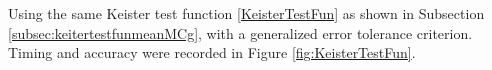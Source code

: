 \documentclass{iitthesis}
\begin{document}
Using the same Keister test function \eqref{KeisterTestFun} as shown in Subsection \ref{subsec:keitertestfunmeanMCg}, with a generalized error tolerance criterion. Timing and accuracy were recorded in Figure \ref{fig:KeisterTestFun}.
%
\end{document}
